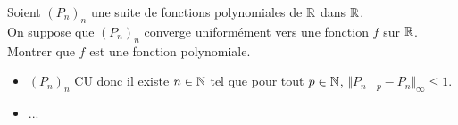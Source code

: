 Soient $(P_n)_n$ une suite de fonctions polynomiales de $\mathbb{R}$ dans $\mathbb{R}$.\\
On suppose que $(P_n)_n$ converge uniformément vers une fonction $f$ sur $\mathbb{R}$. Montrer que $f$ est une fonction polynomiale. 
\begin{itemize}
    \item $(P_n)_n$ CU donc il existe $n \in \mathbb{N}$ tel que pour tout $p \in \mathbb{N}$, $\Vert P_{n+p}-P_n \Vert_{\infty} \leqslant 1$. 
    \item ...
\end{itemize}